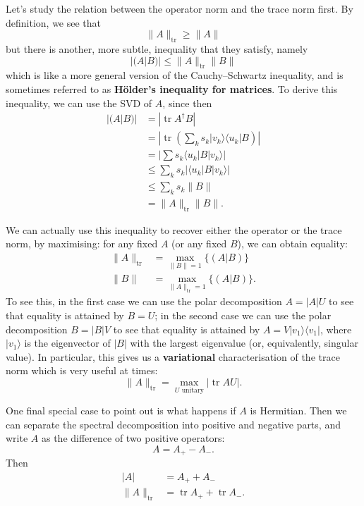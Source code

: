 \documentclass[fleqn]{article}
\begin{document}
Let's study the relation between the operator norm and the trace norm first.
By definition, we see that
\[
  \|A\|_{\operatorname{tr}} \geqslant\|A\|
\]
but there is another, more subtle, inequality that they satisfy, namely
\[
  |(A|B)| \leqslant\|A\|_{\operatorname{tr}}\|B\|
\]
which is like a more general version of the Cauchy--Schwartz inequality, and is sometimes referred to as \textbf{Hölder's inequality for matrices}.
To derive this inequality, we can use the SVD of \(A\), since then
\[
  \begin{aligned}
    |(A|B)|
    &= |\operatorname{tr}A^\dagger B|
  \\&= \left| \operatorname{tr}\left( \sum_k s_k|v_k\rangle\langle u_k| B \right) \right|
  \\&= \left| \sum s_k\langle u_k|B|v_k\rangle \right|
  \\&\leqslant\sum_k s_k|\langle u_k|B|v_k\rangle|
  \\&\leqslant\sum_k s_k\|B\|
  \\&= \|A\|_{\operatorname{tr}}\|B\|.
  \end{aligned}
\]

We can actually use this inequality to recover either the operator or the trace norm, by maximising: for any fixed \(A\) (or any fixed \(B\)), we can obtain equality:
\[
  \begin{aligned}
    \|A\|_{\operatorname{tr}}
    &= \max_{\|B\|=1}\{(A|B)\}
  \\\|B\|
    &= \max_{\|A\|_{\operatorname{tr}}=1}\{(A|B)\}.
  \end{aligned}
\]
To see this, in the first case we can use the polar decomposition \(A=|A|U\) to see that equality is attained by \(B=U\); in the second case we can use the polar decomposition \(B=|B|V\) to see that equality is attained by \(A=V|v_1\rangle\langle v_1|\), where \(|v_1\rangle\) is the eigenvector of \(|B|\) with the largest eigenvalue (or, equivalently, singular value).
In particular, this gives us a \textbf{variational} characterisation of the trace norm which is very useful at times:
\[
  \|A\|_{\operatorname{tr}} = \max_{U\text{ unitary}}|\operatorname{tr}AU|.
\]

One final special case to point out is what happens if \(A\) is Hermitian.
Then we can separate the spectral decomposition into positive and negative parts, and write \(A\) as the difference of two positive operators:
\[
  A = A_+ - A_-.
\]
Then
\[
  \begin{aligned}
    |A|
    &= A_+ + A_-
  \\\|A\|_{\operatorname{tr}}
    &= \operatorname{tr}A_+ + \operatorname{tr}A_-.
  \end{aligned}
\]
\end{document}

